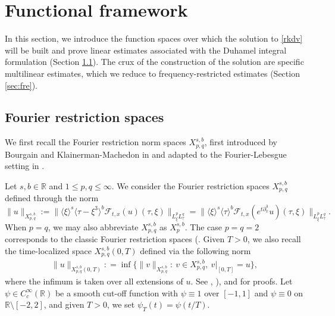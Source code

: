 \documentclass[%
11pt,  reqno]{amsart}
\newcommand{\jap}[1]{\langle #1 \rangle}
\newcommand{\5}{\textup{V}}
\newcommand{\F}{\mathcal{F}}
\newcommand{\dx}{\partial_x}
\theoremstyle{remark}
\newcommand{\R}{\mathbb{R}}
\newcommand{\jb}[1]
{\langle #1 \rangle}
\numberwithin{equation}{section}
\numberwithin{theorem}{section}
\begin{document}
	\section{Functional framework}\label{sec:functional}
	
	In this section, we introduce the function spaces over which the solution to \eqref{rkdv} will be built and prove linear estimates associated with the Duhamel integral formulation (Section \ref{sec:fourier_restr}). The crux of the  construction of the solution are specific multilinear estimates, which we reduce to  frequency-restricted estimates (Section \ref{sec:fre}).
	
	
	\subsection{Fourier restriction spaces}\label{sec:fourier_restr}
	
	We first recall the Fourier restriction norm spaces $X^{s,b}_{p,q}$, first introduced by Bourgain \cite{bourg1, bourg2} and Klainerman-Machedon in \cite{KlainermanMachedon} and adapted to the Fourier-Lebesgue setting in \cite{Grunrock_mkdv, HerrGrunrock_FL}.
	
		
		
		Let $s,b\in \R$ and $1\le p,q \le \infty$. We consider the Fourier restriction spaces $X^{s,b}_{p,q}$ defined through the norm
		\begin{equation}\label{Xsb}
			\| u \|_{X^{s,b}_{p,q}} := \| \jap{\xi}^s \jap{\tau-\xi^3}^b \F_{t,x}(u) (\tau, \xi) \|_{L^p_\xi L^q_\tau}
            =
            \| \jb{\xi}^s \jb{\tau}^b \F_{t,x}(e^{t \dx^3} u ) (\tau, \xi) \|_{L^p_\xi L^q_\tau}. 
		\end{equation}
When $p=q$, we may also abbreviate $X^{s,b}_{p,q}$ as $X^{s,b}_p$. 
		The case $p=q=2$ corresponds to the classic Fourier restriction spaces (\cite{bourg1, bourg2}. 
        Given $T>0$, we also recall the time-localized space $X^{s, b}_{p,q} (0,T)$ defined via the following norm
        \begin{align}
            \| u\|_{X^{s, b}_{p,q}(0,T)} : = \inf 
            \big\{ 
            \| v\|_{X^{s, b}_{p,q}} : \ v\in X^{s,b}_{p,q}, \ v\vert_{[0,T]} = u 
            \big\}, 
        \end{align}
        where the infimum is taken over all extensions of $u$. See \cite[Chapter 2.6]{tao_book}, \cite[Chapter 7.4]{linares_ponce_book}), and  \cite{HerrGrunrock_FL} for proofs. 
        Let  $\psi\in C_c^\infty(\R)$ be a smooth cut-off function with $\psi\equiv 1$ over $[-1,1]$ and $\psi\equiv 0$ on $\R\setminus [-2,2]$, and given $T>0$, we set $\psi_T(t)=\psi(t/T)$.
        
\end{document}
